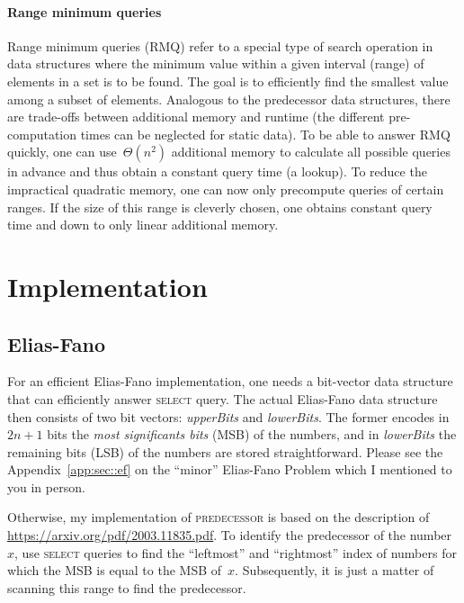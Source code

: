 \documentclass[a4paper,UKenglish,cleveref, autoref, thm-restate]{lipics-v2021}
\begin{document}
	\paragraph*{Range minimum queries}
	Range minimum queries (RMQ) refer to a special type of search operation in data structures where the minimum value within a given interval (range) of elements in a set is to be found. The goal is to efficiently find the smallest value among a subset of elements. Analogous to the predecessor data structures, there are trade-offs between additional memory and runtime (the different pre-computation times can be neglected for static data). To be able to answer RMQ quickly, one can use~$\Theta\left(n^2\right)$ additional memory to calculate all possible queries in advance and thus obtain a constant query time (a lookup). To reduce the impractical quadratic memory, one can now only precompute queries of certain ranges. If the size of this range is cleverly chosen, one obtains constant query time and down to only linear additional memory.
	
	\section{Implementation}
	
	\subsection{Elias-Fano}
	For an efficient Elias-Fano implementation, one needs a bit-vector data structure that can efficiently answer \textsc{select} query. The actual Elias-Fano data structure then consists of two bit vectors: \textit{upperBits} and \textit{lowerBits}. The former encodes in~$2n+1$ bits the \textit{most significants bits} (MSB) of the numbers, and in \textit{lowerBits} the remaining bits (LSB) of the numbers are stored straightforward. Please see the Appendix~\ref{app:sec::ef} on the ``minor'' Elias-Fano Problem which I mentioned to you in person.
	
	Otherwise, my implementation of \textsc{predecessor} is based on the description of \url{https://arxiv.org/pdf/2003.11835.pdf}. To identify the predecessor of the number~$x$, use \textsc{select} queries to find the ``leftmost'' and ``rightmost'' index of numbers for which the MSB is equal to the MSB of~$x$. Subsequently, it is just a matter of scanning this range to find the predecessor.
\end{document}
